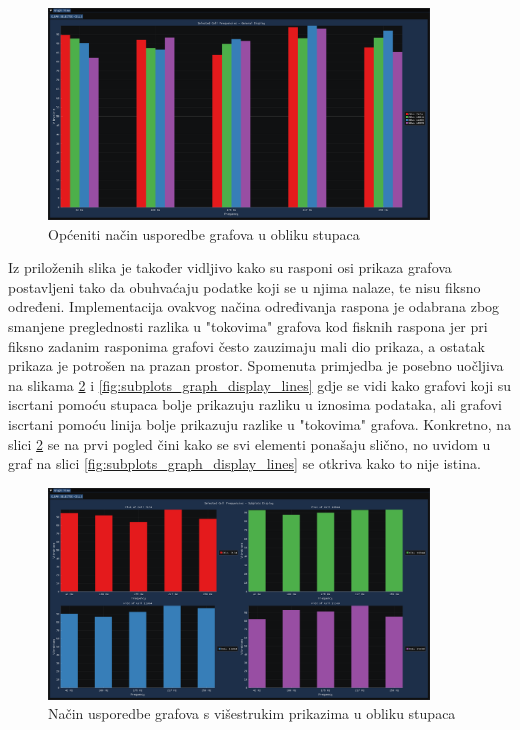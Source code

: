 \documentclass[times, utf8, diplomski]{fer}
\begin{document}
\begin{figure}[H]
	\centering
	\includegraphics[width=0.9\textwidth]{default_graph_display_bars.png}
	\caption{Općeniti način usporedbe grafova u obliku stupaca}
    \label{fig:default_graph_display_bars}
\end{figure}

Iz priloženih slika je također vidljivo kako su rasponi osi prikaza grafova postavljeni tako da obuhvaćaju podatke koji se u njima nalaze, te nisu fiksno određeni. Implementacija ovakvog načina određivanja raspona je odabrana zbog smanjene preglednosti razlika u "tokovima" grafova kod fisknih raspona jer pri fiksno zadanim rasponima grafovi često zauzimaju mali dio prikaza, a ostatak prikaza je potrošen na prazan prostor. Spomenuta primjedba je posebno uočljiva na slikama \ref{fig:subplots_graph_display_bars} i \ref{fig:subplots_graph_display_lines} gdje se vidi kako grafovi koji su iscrtani pomoću stupaca bolje prikazuju razliku u iznosima podataka, ali grafovi iscrtani pomoću linija bolje prikazuju razlike u "tokovima" grafova. Konkretno, na slici \ref{fig:subplots_graph_display_bars} se na prvi pogled čini kako se svi elementi ponašaju slično, no uvidom u graf na slici \ref{fig:subplots_graph_display_lines} se otkriva kako to nije istina.

\begin{figure}[H]
	\centering
	\includegraphics[width=0.9\textwidth]{subplots_graph_display_bars.png}
	\caption{Način usporedbe grafova s višestrukim prikazima u obliku stupaca}
    \label{fig:subplots_graph_display_bars}
\end{figure}
\end{document}

